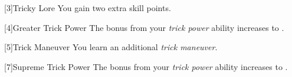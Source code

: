         [3]{Tricky Lore} You gain two extra skill points.

        [4]{Greater Trick Power} The bonus from your \textit{trick power} ability increases to .

        [5]{Trick Maneuver}
        You learn an additional \textit{trick maneuver}.


        [7]{Supreme Trick Power}
        The bonus from your \textit{trick power} ability increases to .







